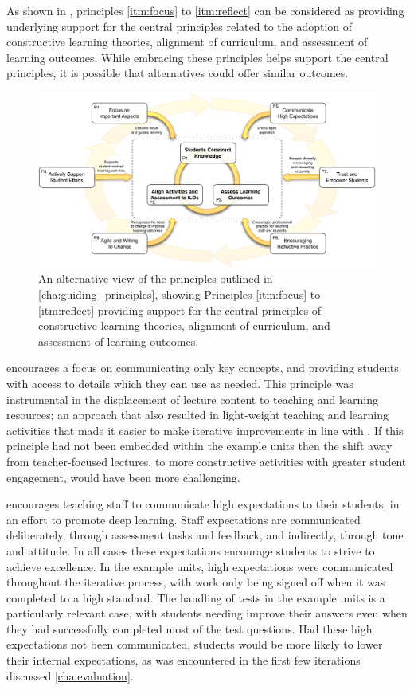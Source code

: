 As shown in , principles \ref{itm:focus} to \ref{itm:reflect} can be considered as providing underlying support for the central principles related to the adoption of constructive learning theories, alignment of curriculum, and assessment of learning outcomes. While embracing these principles helps support the central principles, it is possible that alternatives could offer similar outcomes.

\begin{figure}[htbp]
	\centering
	\includegraphics[width=\textwidth]{HowPrinciples}
	\caption{An alternative view of the principles outlined in \cref{cha:guiding_principles}, showing Principles \ref{itm:focus} to \ref{itm:reflect} providing support for the central principles of constructive learning theories, alignment of curriculum, and assessment of learning outcomes.}
	\label{fig:adjusted_how_principles}
\end{figure}

 encourages a focus on communicating only key concepts, and providing students with access to details which they can use as needed. This principle was instrumental in the displacement of lecture content to teaching and learning resources; an approach that also resulted in light-weight teaching and learning activities that made it easier to make iterative improvements in line with . If this principle had not been embedded within the example units then the shift away from teacher-focused lectures, to more constructive activities with greater student engagement, would have been more challenging.

 encourages teaching staff to communicate high expectations to their students, in an effort to promote deep learning. Staff expectations are communicated deliberately, through assessment tasks and feedback, and indirectly, through tone and attitude. In all cases these expectations encourage students to strive to achieve excellence. In the example units, high expectations were communicated throughout the iterative process, with work only being signed off when it was completed to a high standard. The handling of tests in the example units is a particularly relevant case, with students needing improve their answers even when they had successfully completed most of the test questions. Had these high expectations not been communicated, students would be more likely to lower their internal expectations, as was encountered in the first few iterations discussed \cref{cha:evaluation}.


